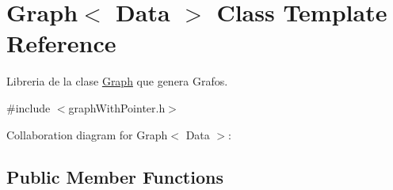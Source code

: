 \hypertarget{class_graph}{\section{Graph$<$ Data $>$ Class Template Reference}
\label{class_graph}
}


Libreria de la clase \hyperlink{class_graph}{Graph} que genera Grafos.  




{\ttfamily \#include $<$graph\+With\+Pointer.\+h$>$}



Collaboration diagram for Graph$<$ Data $>$\+:
\subsection*{Public Member Functions}

